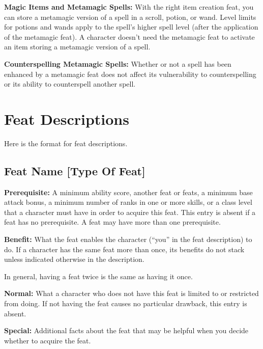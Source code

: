 \textbf{Magic Items and Metamagic Spells:} With the right item creation feat, you can store a metamagic version of a spell in a scroll, potion, or wand. Level limits for potions and wands apply to the spell’s higher spell level (after the application of the metamagic feat). A character doesn’t need the metamagic feat to activate an item storing a metamagic version of a spell.

\textbf{Counterspelling Metamagic Spells:} Whether or not a spell has been enhanced by a metamagic feat does not affect its vulnerability to counterspelling or its ability to counterspell another spell.

\section{Feat Descriptions}
Here is the format for feat descriptions.

\subsection{Feat Name {\normalsize[Type Of Feat]}}
\textbf{Prerequisite:} A minimum ability score, another feat or feats, a minimum base attack bonus, a minimum number of ranks in one or more skills, or a class level that a character must have in order to acquire this feat. This entry is absent if a feat has no prerequisite. A feat may have more than one prerequisite.

\textbf{Benefit:} What the feat enables the character (``you'' in the feat description) to do. If a character has the same feat more than once, its benefits do not stack unless indicated otherwise in the description.

In general, having a feat twice is the same as having it once.

\textbf{Normal:} What a character who does not have this feat is limited to or restricted from doing. If not having the feat causes no particular drawback, this entry is absent.

\textbf{Special:} Additional facts about the feat that may be helpful when you decide whether to acquire the feat.